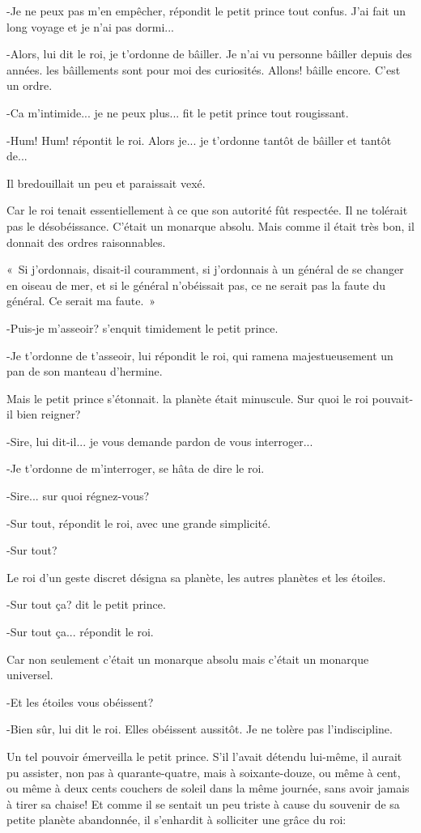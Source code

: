 \documentclass{report}
\begin{document}
\begin{paracol}{2}
-Je ne peux pas m'en empêcher, répondit le petit prince tout confus. J'ai fait un long voyage et je n'ai pas dormi...

-Alors, lui dit le roi, je t'ordonne de bâiller. Je n'ai vu personne bâiller depuis des années. les bâillements sont pour moi des curiosités. Allons! bâille encore. C'est un ordre.

-Ca m'intimide... je ne peux plus... fit le petit prince tout rougissant.

-Hum! Hum! répontit le roi. Alors je... je t'ordonne tantôt de bâiller et tantôt de...

Il bredouillait un peu et paraissait vexé.

Car le roi tenait essentiellement à ce que son autorité fût respectée. Il ne tolérait pas le désobéissance. C'était un monarque absolu. Mais comme il était très bon, il donnait des ordres raisonnables.

«~Si j'ordonnais, disait-il couramment, si j'ordonnais à un général de se changer en oiseau de mer, et si le général n'obéissait pas, ce ne serait pas la faute du général. Ce serait ma faute.~»

-Puis-je m'asseoir? s'enquit timidement le petit prince.

-Je t'ordonne de t'asseoir, lui répondit le roi, qui ramena majestueusement un pan de son manteau d'hermine.

Mais le petit prince s'étonnait. la planète était minuscule. Sur quoi le roi pouvait-il bien reigner?

-Sire, lui dit-il... je vous demande pardon de vous interroger...

-Je t'ordonne de m'interroger, se hâta de dire le roi.

-Sire... sur quoi régnez-vous?

-Sur tout, répondit le roi, avec une grande simplicité.

-Sur tout?

Le roi d'un geste discret désigna sa planète, les autres planètes et les étoiles.

-Sur tout ça? dit le petit prince.

-Sur tout ça... répondit le roi.

Car non seulement c'était un monarque absolu mais c'était un monarque universel.

-Et les étoiles vous obéissent?

-Bien sûr, lui dit le roi. Elles obéissent aussitôt. Je ne tolère pas l'indiscipline.

Un tel pouvoir émerveilla le petit prince. S'il l'avait détendu lui-même, il aurait pu assister, non pas à quarante-quatre, mais à soixante-douze, ou même à cent, ou même à deux cents couchers de soleil dans la même journée, sans avoir jamais à tirer sa chaise! Et comme il se sentait un peu triste à cause du souvenir de sa petite planète abandonnée, il s'enhardit à solliciter une grâce du roi:


\end{paracol}
\end{document}
